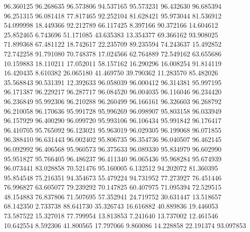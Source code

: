96.360125
96.268635
96.573806
94.537165
95.573231
96.432630
96.685394
96.251315
96.081418
77.817465
92.252104
81.628421
95.973044
81.536912
54.099998
18.449366
92.212789
66.117425
8.397166
90.372166
14.604612
25.852465
6.743696
51.171085
43.635383
13.354377
69.366162
93.908025
71.899368
67.481122
18.742617
22.235709
89.235594
74.243637
15.492852
72.742258
91.791080
70.748378
17.024566
62.764889
72.549162
63.655686
10.159883
18.110211
17.052011
58.157162
16.290296
16.008254
91.814119
16.420435
8.610382
26.065180
41.469750
39.790362
11.283570
85.482026
35.568843
90.531391
12.392633
96.058039
96.000412
96.314381
95.997195
96.171387
96.229217
96.287717
96.084520
96.004035
96.116046
96.234420
96.236849
95.992306
96.210288
96.260499
96.166161
96.326603
96.268792
96.210058
96.170636
95.991728
95.996269
96.098907
95.803158
96.033949
96.157929
96.400290
96.099720
95.993106
96.106434
95.991842
96.176417
96.410705
95.765092
96.123021
95.963019
96.029305
96.199068
96.071855
96.388410
96.631443
96.002402
95.806735
96.354736
96.040507
96.462145
96.092992
96.406568
95.960573
96.375633
96.089330
95.834979
96.602990
95.951827
95.766405
96.486237
96.411340
96.065436
95.968284
95.674939
96.073441
83.028858
70.521476
95.160005
6.132512
94.202072
81.360395
95.854548
75.216351
94.354673
55.479224
94.731952
77.273927
76.451446
76.996827
63.605077
79.239292
70.147825
60.407975
71.095394
72.529515
48.154883
76.837806
71.507695
57.352941
24.719752
30.631447
13.518657
68.142350
2.733738
88.641730
35.326743
16.616882
40.889836
19.446053
73.587522
15.327018
77.799954
13.813853
7.241640
13.737002
12.461546
10.642554
8.592306
41.800565
17.797066
9.860086
14.228858
22.191374
93.097853
